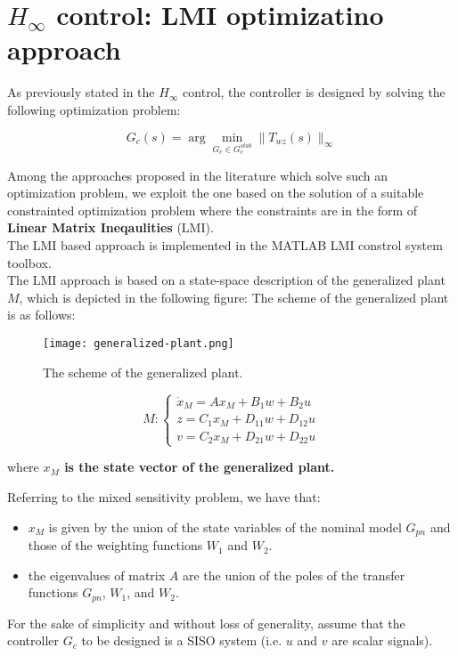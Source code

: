  \section{$H_\infty$ control: LMI optimizatino approach}
 As previously stated in the $H_\infty$ control, the controller is designed by solving the following optimization problem:
 
 \[
 G_c(s) = \arg \min\limits_{G_c \in G_c^{stab}} \|T_{wz}(s)\|_\infty
 \]
 
 Among the approaches proposed in the literature which solve such an optimization problem, we exploit the one based on the solution of a suitable constrainted optimization problem where the constraints are in the form of \textbf{Linear Matrix Ineqaulities} (LMI).\\
 
 The LMI based approach is implemented in the MATLAB LMI constrol system toolbox.\\
 
The LMI approach is based on a state-space description of the generalized plant $M$, which is depicted in the following figure:
The scheme of the generalized plant is as follows:
\begin{figure}[H]
    \centering
    \texttt{[image: generalized-plant.png]}
    \caption{The scheme of the generalized plant.}
\end{figure}

\[
M: 
\begin{cases}
\dot{x}_M = A x_M + B_1 w + B_2 u\\
z = C_1 x_M + D_{11} w + D_{12} u\\
v = C_2 x_M + D_{21} w + D_{22} u
\end{cases}
\]

where \textbf{$x_M$ is the state vector of the generalized plant.} 

Referring to the mixed sensitivity problem, we have that:
\begin{itemize}
\item $x_M$ is given by the union of the state variables of the nominal model $G_{pn}$ and those of the weighting functions $W_1$ and $W_2$.
\item the eigenvalues of matrix $A$ are the union of the poles of the transfer functions $G_{pn}$, $W_1$, and $W_2$.
\end{itemize}

For the sake of simplicity and without loss of generality, assume that the controller $G_c$ to be designed is a SISO system (i.e. $u$ and $v$ are scalar signals).\\

